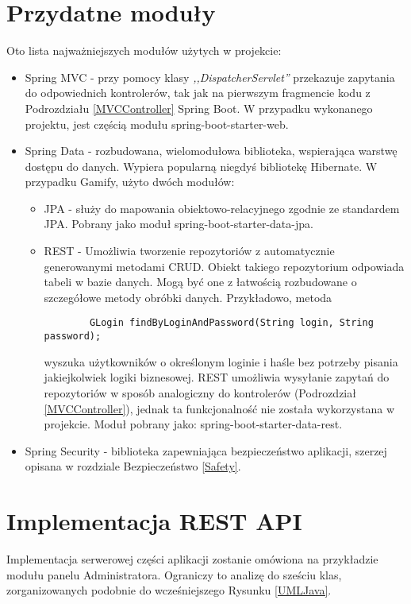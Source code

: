 \documentclass[a4paper,12pt,twoside,openany]{report}
\begin{document}
\section{Przydatne moduły}
Oto lista najważniejszych modułów użytych w projekcie:
\begin{itemize}
	\item Spring MVC - przy pomocy klasy \textit{,,DispatcherServlet''} przekazuje zapytania do odpowiednich kontrolerów, tak jak na pierwszym fragmencie kodu z Podrozdziału \ref{MVCController} Spring Boot. W przypadku wykonanego projektu, jest częścią modułu spring-boot-starter-web.
	\item Spring Data - rozbudowana, wielomodułowa biblioteka, wspierająca warstwę dostępu do danych. Wypiera popularną niegdyś bibliotekę Hibernate. W przypadku Gamify, użyto dwóch modułów:
	\begin{itemize}
		\item JPA - służy do mapowania obiektowo-relacyjnego zgodnie ze standardem JPA. Pobrany jako moduł spring-boot-starter-data-jpa.
		\item REST - Umożliwia tworzenie repozytoriów z automatycznie generowanymi metodami CRUD. Obiekt takiego repozytorium odpowiada tabeli w bazie danych. Mogą być one z łatwością rozbudowane o szczegółowe metody obróbki danych. Przykładowo, metoda 
		\begin{lstlisting}
		GLogin findByLoginAndPassword(String login, String password);
		\end{lstlisting}
		wyszuka użytkowników o określonym loginie i haśle bez potrzeby pisania jakiejkolwiek logiki biznesowej. REST umożliwia wysyłanie zapytań do repozytoriów w sposób analogiczny do kontrolerów (Podrozdział \ref{MVCController}), jednak ta funkcjonalność nie została wykorzystana w projekcie. Moduł pobrany jako: spring-boot-starter-data-rest.
	\end{itemize}
	\item Spring Security - biblioteka zapewniająca bezpieczeństwo aplikacji, szerzej opisana w rozdziale Bezpieczeństwo \ref{Safety}.
\end{itemize}
\section{Implementacja REST API}
Implementacja serwerowej części aplikacji zostanie omówiona na przykładzie modułu panelu Administratora. Ograniczy to analizę do sześciu klas, zorganizowanych podobnie do wcześniejszego Rysunku \ref{UMLJava}.
\end{document}
